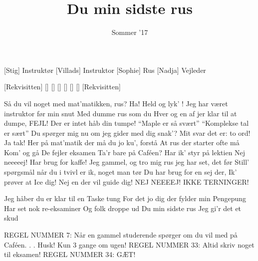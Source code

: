 \documentclass[a4paper,11pt]{article}
\title{Du min sidste rus}
\author{Sommer '17}
\begin{document}
\maketitle

\begin{roles}
[Stig] Instruktør
[Villads] Instruktor
[Sophie] Rus
[Nadja] Vejleder
\end{roles}

\begin{props}
[Rekvisitten]
[]
[]
[]
[]
[]
[]
[Rekvisitten]
\end{props}


\begin{song}

%
Så du vil noget med mat'matikken, rus?
Ha! Held og lyk' !
Jeg har været instruktor før min snut
Med dumme rus som du
%
Hver og en af jer klar til at dumpe,
FEJL! 
Der er intet håb din tumpe!
``Maple er så svært''
``Komplekse tal er sært''
Du spørger mig nu om jeg gider med dig snak'?
Mit svar det er: to ord!
%
Ja tak!
%
Her på mat'matik der må du jo ku', forstå
At rus der starter ofte må
Kom' og gå
De fejler eksamen
Ta'r bare på Caféen?
Har ik' styr på lektien
Nej neeeeej! Har brug for kaffe!
Jeg gammel, og tro mig rus jeg har set, det før
Still' spørgsmål når du i tvivl er ik, noget man tør
Du har brug for en sej der,
%
Ik' prøver at Ice dig! 
Nej en der vil guide dig!
%
NEJ NEEEEJ! IKKE TERNINGER!

%
Jeg håber du er klar til en
Taske tung
For det jo dig der fylder min
Pengepung
Har set nok re-eksaminer
Og folk droppe ud
Du min sidste rus
Jeg gi'r det et skud

%
REGEL NUMMER 7: Når en gammel studerende spørger om
du vil med på Caféen. . . Husk! Kun 3 gange om ugen!
REGEL NUMMER 33: Altid skriv noget til eksamen!
%
REGEL NUMMER 34: GÆT!


\end{song}
\end{document}
